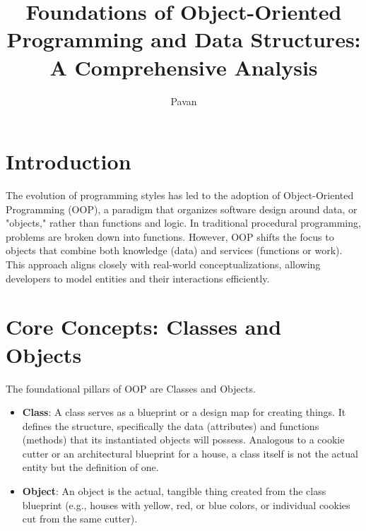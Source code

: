 \documentclass[10pt,journal,compsoc]{IEEEtran}
\begin{document}
\title{Foundations of Object-Oriented Programming and Data Structures: A Comprehensive Analysis}

\author{ Pavan }


\maketitle
\IEEEdisplaynontitleabstractindextext
\IEEEpeerreviewmaketitle


\section{Introduction}
The evolution of programming styles has led to the adoption of Object-Oriented Programming (OOP), a paradigm that organizes software design around data, or "objects," rather than functions and logic. In traditional procedural programming, problems are broken down into functions. However, OOP shifts the focus to objects that combine both knowledge (data) and services (functions or work). This approach aligns closely with real-world conceptualizations, allowing developers to model entities and their interactions efficiently.

\section{Core Concepts: Classes and Objects}
The foundational pillars of OOP are Classes and Objects.
\begin{itemize}
\item \textbf{Class}: A class serves as a blueprint or a design map for creating things. It defines the structure, specifically the data (attributes) and functions (methods) that its instantiated objects will possess. Analogous to a cookie cutter or an architectural blueprint for a house, a class itself is not the actual entity but the definition of one.
\item \textbf{Object}: An object is the actual, tangible thing created from the class blueprint (e.g., houses with yellow, red, or blue colors, or individual cookies cut from the same cutter).
\end{itemize}
\end{document}
